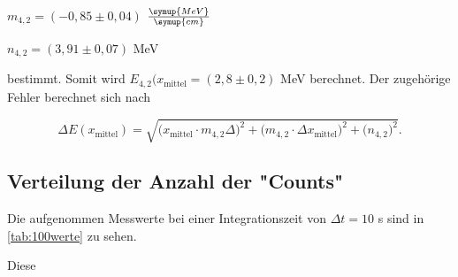 \begin{center}
    $m_{4,2} = (-0,85 \pm 0,04)$ $\frac{\symup{MeV}}{\symup{cm}}$

    $n_{4,2} = (3,91 \pm 0,07)$ MeV
\end{center}

bestimmt.
Somit wird $E_{4,2}(x_\text{mittel} = (2,8 \pm 0,2)$ MeV berechnet. Der zugehörige Fehler berechnet sich nach

\begin{equation}
    \Delta E(x_\text{mittel}) = \sqrt{\bigg( x_\text{mittel} \cdot m_{4,2} \Delta \bigg)^2 + \bigg(m_{4,2} \cdot \Delta x_\text{mittel} \bigg)^2 + \bigg( n_{4,2} \bigg)^2}.
\end{equation}




\subsection{Verteilung der Anzahl der "Counts"}

Die aufgenommen Messwerte bei einer Integrationszeit von $\Delta t = 10$ s sind in \autoref{tab:100werte} zu sehen.



Diese